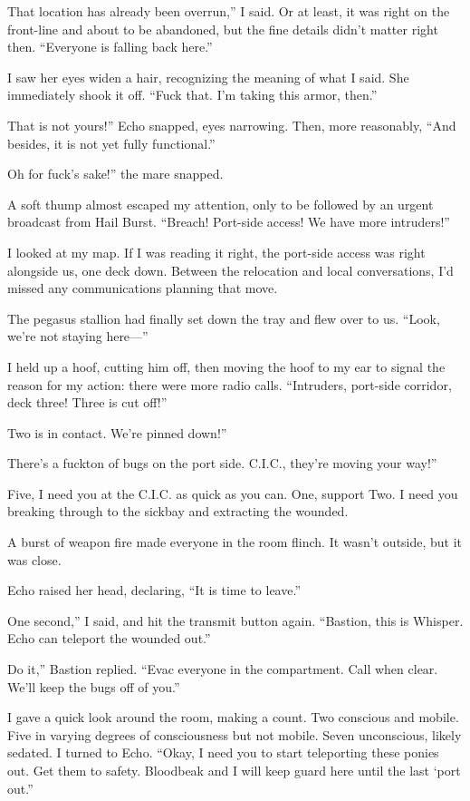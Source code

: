 \leavevmode{}That location has already been overrun,” I said. Or at least, it was right on the front-line and about to be abandoned, but the fine details didn’t matter right then. “Everyone is falling back here.”

I saw her eyes widen a hair, recognizing the meaning of what I said. She immediately shook it off. “Fuck that. I’m taking this armor, then.”

\leavevmode{}That is not yours!” Echo snapped, eyes narrowing. Then, more reasonably, “And besides, it is not yet fully functional.”

\leavevmode{}Oh for fuck’s sake!” the mare snapped.

A soft thump almost escaped my attention, only to be followed by an urgent broadcast from Hail Burst. “Breach! Port-side access! We have more intruders!”

I looked at my map. If I was reading it right, the port-side access was right alongside us, one deck down. Between the relocation and local conversations, I’d missed any communications planning that move.

The pegasus stallion had finally set down the tray and flew over to us. “Look, we’re not staying here—”

I held up a hoof, cutting him off, then moving the hoof to my ear to signal the reason for my action: there were more radio calls. “Intruders, port-side corridor, deck three! Three is cut off!”

\leavevmode{}Two is in contact. We’re pinned down!”

\leavevmode{}There’s a fuckton of bugs on the port side. C.I.C., they’re moving your way!”

\leavevmode{}Five, I need you at the C.I.C. as quick as you can. One, support Two. I need you breaking through to the sickbay and extracting the wounded.

A burst of weapon fire made everyone in the room flinch. It wasn’t outside, but it was close.

Echo raised her head, declaring, “It is time to leave.”

\leavevmode{}One second,” I said, and hit the transmit button again. “Bastion, this is Whisper. Echo can teleport the wounded out.”

\leavevmode{}Do it,” Bastion replied. “Evac everyone in the compartment. Call when clear. We’ll keep the bugs off of you.”

I gave a quick look around the room, making a count. Two conscious and mobile. Five in varying degrees of consciousness but not mobile. Seven unconscious, likely sedated. I turned to Echo. “Okay, I need you to start teleporting these ponies out. Get them to safety. Bloodbeak and I will keep guard here until the last ‘port out.”

